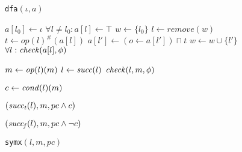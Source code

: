 \begin{figure}[t]
\noindent\begin{minipage}[t]{0.4\textwidth}
\begin{algorithm}[H]
\renewcommand{\algorithmicindent}{0.6em}
\caption{{\tt dfa}$(\iota,a)$}
\label{alg-dfa}
\begin{algorithmic}
 \STATE $a[l_0] \gets \iota$
 \STATE $\forall l \not= l_0 : a[l] \gets \top$
 \STATE $w \gets \{l_0\}$
   \STATE $l \gets remove(w)$
   \STATE $t \gets {op(l)}^{\#}(a[l])$
     \STATE $a[l'] \gets (o \gets a[l']) \sqcap t$
       \STATE $w \gets w \cup \{l'\}$
     \ENDIF
   \ENDFOR
 \ENDWHILE
 \STATE $\forall l : \mathit{check}(a[l],\phi)$
\end{algorithmic}
\end{algorithm}
\end{minipage}%
\hfill
\begin{minipage}[t]{0.4\textwidth}
\begin{algorithm}[H]
\renewcommand{\algorithmicindent}{0.6em}
\caption{{\tt symx}$(l,m,pc)$}
\label{alg-symexe}
\begin{algorithmic}
 \RETURN
 \ENDIF
   \STATE $m \gets \mathit{op}(l)(m)$
   \STATE $l \gets \mathit{succ}(l)$
   \STATE $\mathit{check}(l,m,\phi)$
 \ENDWHILE

 \STATE $c \gets \mathit{cond}(l)(m)$

   $(\mathit{succ_t}(l), m, pc \wedge c)$
 \ENDIF

   $(\mathit{succ_f}(l), m, pc \wedge \neg c)$
 \ENDIF
\end{algorithmic}
\end{algorithm}
\end{minipage}
\end{figure}

